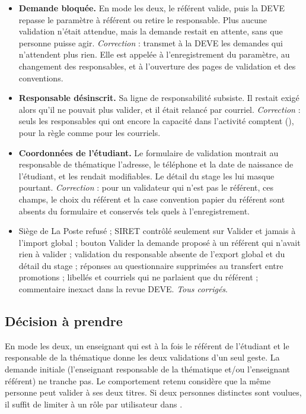 \documentclass[11pt,a4paper]{article}
\newcommand{\grav}[1]{\textbf{\textcolor{#1}{\textbullet}}}
\newcommand{\maj}{\grav{orange}}
\newcommand{\mineure}{\grav{gray}}
\begin{document}
\begin{itemize}
  \item[\maj] \textbf{Demande bloquée.} En mode \og les deux\fg{}, le référent valide, puis la DEVE
    repasse le paramètre à \og référent\fg{} ou retire le responsable. Plus aucune validation
    n'était attendue, mais la demande restait en attente, sans que personne puisse agir.
    \emph{Correction} :  transmet à la DEVE les demandes
    qui n'attendent plus rien. Elle est appelée à l'enregistrement du paramètre, au changement des
    responsables, et à l'ouverture des pages de validation et des conventions.
  \item[\maj] \textbf{Responsable désinscrit.} Sa ligne de responsabilité subsiste. Il restait
    exigé alors qu'il ne pouvait plus valider, et il était relancé par courriel. \emph{Correction} :
    seuls les responsables qui ont encore la capacité dans l'activité comptent
    (), pour la règle comme pour les courriels.
  \item[\maj] \textbf{Coordonnées de l'étudiant.} Le formulaire de validation montrait au
    responsable de thématique l'adresse, le téléphone et la date de naissance de l'étudiant, et les
    rendait modifiables. Le détail du stage les lui masque pourtant. \emph{Correction} : pour un
    validateur qui n'est pas le référent, ces champs, le choix du référent et la case \og convention
    papier\fg{} du référent sont absents du formulaire et conservés tels quels à l'enregistrement.
  \item[\mineure] Siège de La Poste refusé ; SIRET contrôlé seulement sur \og Valider\fg{} et jamais à
    l'import global ; bouton \og Valider la demande\fg{} proposé à un référent qui n'avait rien à
    valider ; validation du responsable absente de l'export global et du détail du stage ; réponses
    au questionnaire supprimées au transfert entre promotions ; libellés et courriels qui ne
    parlaient que du référent ; commentaire inexact dans la revue DEVE. \emph{Tous corrigés}.
\end{itemize}

\subsection{Décision à prendre}
\label{sec:decision}

En mode \og les deux\fg{}, un enseignant qui est à la fois le référent de l'étudiant et le
responsable de la thématique donne les deux validations d'un seul geste. La demande initiale
(\og l'enseignant responsable de la thématique et/ou l'enseignant référent\fg{}) ne tranche pas. Le
comportement retenu considère que la même personne peut valider à ses deux titres. Si deux personnes
distinctes sont voulues, il suffit de limiter à un rôle par utilisateur dans
.
\end{document}
